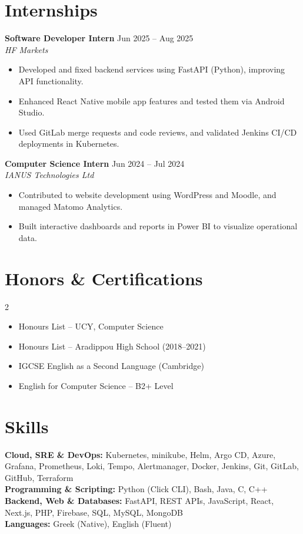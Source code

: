 \documentclass[11pt]{article}
\begin{document}
\section*{Internships}
\textbf{Software Developer Intern} \hfill Jun 2025 -- Aug 2025\\
\textit{HF Markets}
\begin{itemize}
\item Developed and fixed backend services using FastAPI (Python), improving API functionality.
\item Enhanced React Native mobile app features and tested them via Android Studio.
\item Used GitLab merge requests and code reviews, and validated Jenkins CI/CD deployments in Kubernetes.
\end{itemize}

\vspace{0.1cm}

\textbf{Computer Science Intern} \hfill Jun 2024 -- Jul 2024\\
\textit{IANUS Technologies Ltd}
\begin{itemize}
\item Contributed to website development using WordPress and Moodle, and managed Matomo Analytics.
\item Built interactive dashboards and reports in Power BI to visualize operational data.
\end{itemize}

\section*{Honors \& Certifications}
\begin{multicols}{2}
\begin{itemize}
    \item Honours List -- UCY, Computer Science
    \item Honours List -- Aradippou High School (2018--2021)
    \item IGCSE English as a Second Language (Cambridge)
    \item English for Computer Science -- B2+ Level
\end{itemize}
\end{multicols}

\section*{Skills}
\textbf{Cloud, SRE \& DevOps:} Kubernetes, minikube, Helm, Argo CD, Azure, Grafana, Prometheus, Loki, Tempo, Alertmanager, Docker, Jenkins, Git, GitLab, GitHub, Terraform \\
\textbf{Programming \& Scripting:} Python (Click CLI), Bash, Java, C, C++ \\
\textbf{Backend, Web \& Databases:} FastAPI, REST APIs, JavaScript, React, Next.js, PHP, Firebase, SQL, MySQL, MongoDB \\
\textbf{Languages:} Greek (Native), English (Fluent)
\end{document}
